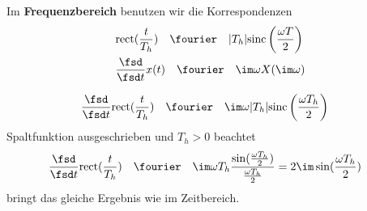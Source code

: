 \begin{Ansatz}
Im \textbf{Frequenzbereich} benutzen wir die Korrespondenzen
\begin{align}
&\mathrm{rect}(\frac{t}{T_h}) \quad \fourier \quad |T_h| \mathrm{sinc}\left(\frac{\omega T}{2}\right)\\
&\frac{\fsd}{\fsd t} x(t) \quad\fourier\quad \im\omega X(\im\omega)
\end{align}
\end{Ansatz}

\begin{ExCalc}
\begin{align}
\frac{\fsd}{\fsd t} \mathrm{rect}(\frac{t}{T_h}) &\quad \fourier \quad \im\omega |T_h| \mathrm{sinc}\left(\frac{\omega T_h}{2}\right)
\end{align}
Spaltfunktion ausgeschrieben und $T_h>0$ beachtet
\begin{align}
\frac{\fsd}{\fsd t} \mathrm{rect}(\frac{t}{T_h}) &\quad \fourier \quad \im\omega T_h \frac{\sin (\frac{\omega T_h}{2})}{\frac{\omega T_h}{2}}
=2\im\sin (\frac{\omega T_h}{2})
\end{align}
bringt das gleiche Ergebnis wie im Zeitbereich.
\end{ExCalc}


